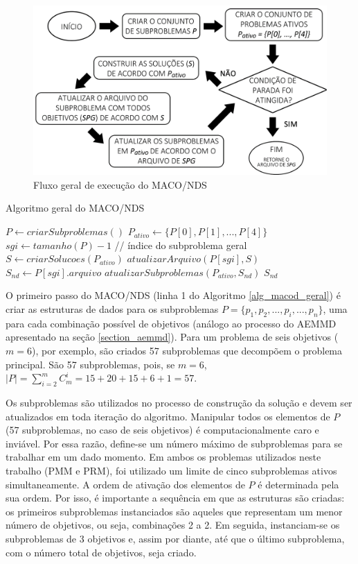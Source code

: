 \begin{figure}[!htbp]	
	\includegraphics[width=1\textwidth]{cap_algoritmo-proposto/figs/fluxo-algoritmo-geral}
	\caption{\label{img_fluxo_maconds}Fluxo geral de execução do MACO/NDS}
\end{figure}

\begin{algorithm}[!htbp]
	\caption{Algoritmo geral do MACO/NDS}
	\label{alg_macod_geral}
	\begin{algorithmic}[1]
		\State $P \gets criarSubproblemas()$
		\State $P_{ativo} \gets \{P[0], P[1], ..., P[4]\}$
		\State $sgi \gets tamanho(P) - 1$ // índice do subproblema geral
		\State $S \gets criarSolucoes(P_{ativo})$
		\State $atualizarArquivo(P[sgi], S)$
		\State $S_{nd} \gets P[sgi].arquivo$
		\State $atualizarSubproblemas(P_{ativo}, S_{nd})$
		\EndWhile
		\State \Return $S_{nd}$
	\end{algorithmic}
\end{algorithm}

O primeiro passo do MACO/NDS (linha 1 do Algoritmo \ref{alg_macod_geral}) é criar as estruturas de dados para os subproblemas $P = \{p_1, p_2, ..., p_i, ..., p_n\}$, uma para cada combinação possível de objetivos (análogo ao processo do AEMMD apresentado na seção \ref{section_aemmd}). Para um problema de seis objetivos ($m = 6$), por exemplo, são criados 57 subproblemas que decompõem o problema principal. São 57 subproblemas, pois, se $m = 6$, $|P| = \sum_{i = 2}^m C_m^i = 15 + 20 + 15 + 6 + 1 = 57$.

Os subproblemas são utilizados no processo de construção da solução e devem ser atualizados em toda iteração do algoritmo. Manipular todos os elementos de $P$ (57 subproblemas, no caso de seis objetivos) é computacionalmente caro e inviável. Por essa razão, define-se um número máximo de subproblemas para se trabalhar em um dado momento. Em ambos os problemas utilizados neste trabalho (PMM e PRM), foi utilizado um limite de cinco subproblemas ativos simultaneamente. A ordem de ativação dos elementos de $P$ é determinada pela sua ordem. Por isso, é importante a sequência em que as estruturas são criadas: os primeiros subproblemas instanciados são aqueles que representam um menor número de  objetivos, ou seja, combinações 2 a 2. Em seguida, instanciam-se os subproblemas de 3 objetivos e, assim por diante, até que o último subproblema, com o número total de objetivos, seja criado.

